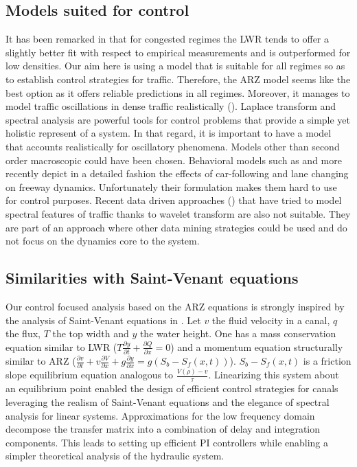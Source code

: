 \documentclass[preprint]{elsarticle}
\begin{document}
\subsection{Models suited for control}
It has been remarked in \cite{Fan} that for congested regimes the
LWR tends to offer a slightly better fit with respect to empirical
measurements and is outperformed for low densities. Our aim here is
using a model that is suitable for all regimes so as to establish
control strategies for traffic. Therefore, the ARZ model seems like
the best option as it offers reliable predictions in all regimes.
Moreover, it manages to model traffic oscillations in dense traffic
realistically (\cite{Greenberg_congestionredux}). Laplace transform
and spectral analysis are powerful tools for control problems that
provide a simple yet holistic represent of a system. In that regard,
it is important to have a model that accounts realistically for oscillatory
phenomena. Models other than second order macroscopic could have been
chosen. Behavioral models such as \cite{Newel} and more recently
\cite{Chen2012} depict in a detailed fashion the effects of car-following
and lane changing on freeway dynamics. Unfortunately their formulation
makes them hard to use for control purposes. Recent data driven approaches
(\cite{Zheng2011}) that have tried to model spectral features of
traffic thanks to wavelet transform are also not suitable. They are
part of an approach where other data mining strategies could be used
and do not focus on the dynamics core to the system.

\subsection{Similarities with Saint-Venant equations}
Our control focused analysis based on the ARZ equations is strongly
inspired by the analysis of Saint-Venant equations in \cite{litrico2009modeling}.
Let $v$ the fluid velocity in a canal, $q$ the flux, $T$ the top
width and $y$ the water height. One has a mass conservation equation
similar to LWR ($T\frac{\partial y}{\partial t}+\frac{\partial Q}{\partial x}=0$)
and a momentum equation structurally similar to ARZ ($\frac{\partial v}{\partial t}+v\frac{\partial V}{\partial x}+g\frac{\partial y}{\partial x}=g\left(S_{b}-S_{f}\left(x,t\right)\right)$).
$S_{b}-S_{f}\left(x,t\right)$ is a friction slope equilibrium equation
analogous to $\frac{V\left(\rho\right)-v}{\tau}$. Linearizing this
system about an equilibrium point enabled the design of efficient
control strategies for canals leveraging the realism of Saint-Venant
equations and the elegance of spectral analysis for linear systems.
Approximations for the low frequency domain decompose the transfer
matrix into a combination of delay and integration components. This
leads to setting up efficient PI controllers while enabling a simpler
theoretical analysis of the hydraulic system.
\end{document}

